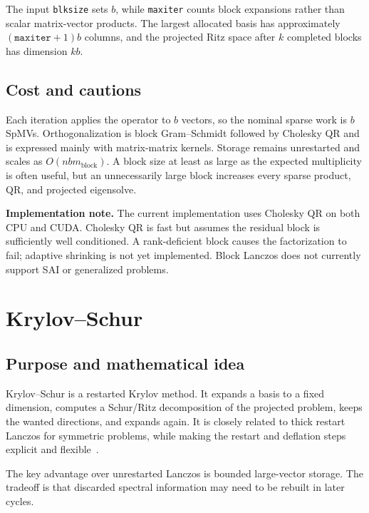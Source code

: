 \documentclass[11pt]{article}
\newcommand{\code}[1]{\texttt{#1}}
\begin{document}
The input \code{blksize} sets $b$, while \code{maxiter} counts block
expansions rather than scalar matrix-vector products.  The largest allocated
basis has approximately $(\code{maxiter}+1)b$ columns, and the projected Ritz
space after $k$ completed blocks has dimension $kb$.

\subsection{Cost and cautions}

Each iteration applies the operator to $b$ vectors, so the nominal sparse work
is $b$ SpMVs.  Orthogonalization is block Gram--Schmidt followed by Cholesky QR
and is expressed mainly with matrix-matrix kernels.  Storage remains unrestarted
and scales as $O(nbm_{\mathrm{block}})$.  A block size at least as large as the
expected multiplicity is often useful, but an unnecessarily large block
increases every sparse product, QR, and projected eigensolve.

\par\medskip
\noindent\textbf{Implementation note.}
The current implementation uses Cholesky QR on both CPU and CUDA.  Cholesky QR
is fast but assumes the residual block is sufficiently well conditioned.  A
rank-deficient block causes the factorization to fail; adaptive shrinking is not
yet implemented.  Block Lanczos does not currently support SAI or generalized
problems.

\section{Krylov--Schur}
\label{sec:krylov-schur}

\subsection{Purpose and mathematical idea}

Krylov--Schur is a restarted Krylov method.  It expands a basis to a fixed
dimension, computes a Schur/Ritz decomposition of the projected problem, keeps
the wanted directions, and expands again.  It is closely related to thick
restart Lanczos for symmetric problems, while making the restart and deflation
steps explicit and flexible~\cite{krylovschur}.

The key advantage over unrestarted Lanczos is bounded large-vector storage.
The tradeoff is that discarded spectral information may need to be rebuilt in
later cycles.
\end{document}
